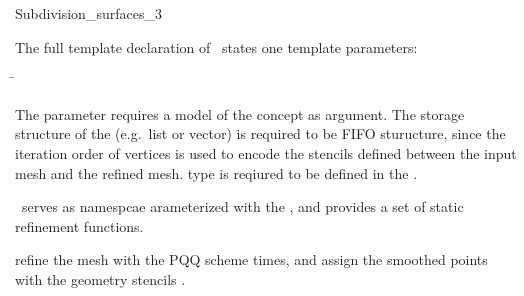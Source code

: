 \begin{ccRefClass}{Subdivision_surfaces_3}
\ccParameters

The full template declaration of \ccClassTemplateName\ states one
template parameters:

\begin{tabbing}
 \=\\
\end{tabbing}
   
The  parameter requires a model of 
the  concept as argument. The storage structure
of the  (e.g.~list or vector) is required to be
FIFO sturucture, since the iteration order of vertices is used
to encode the stencils defined between the input mesh and the refined
mesh.  type is reqiured to be defined in the .








\ccCreation

\ccClassTemplateName\ serves as namespcae arameterized with
the , and provides a set of static refinement 
functions. 


\ccThree{}{}{}
{refine the mesh  with the PQQ scheme 
 times, and assign the smoothed points with the geometry 
stencils .}


\end{ccRefClass}
